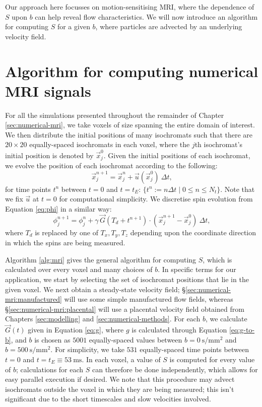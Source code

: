         Our approach here focusses on motion-sensitising MRI, where the dependence of $S$ upon $b$ can help reveal flow characteristics. We will now introduce an algorithm for computing $S$ for a given $b$, where particles are advected by an underlying velocity field.

    \section{Algorithm for computing numerical MRI signals} \label{sec:numerical-mri:algorithm}
        For all the simulations presented throughout the remainder of Chapter \ref{sec:numerical-mri}, we take voxels of size  spanning the entire domain of interest. We then distribute the initial positions of many isochromats such that there are $20 \times 20$ equally-spaced isochromats in each voxel, where the $j$th isochromat's initial position is denoted by $\vec{x}^0_j$. Given the initial positions of each isochromat, we evolve the position of each isochromat according to the following:
        \begin{equation}
            \vec{x}^{n+1}_j = \vec{x}^n_j + \vec{u}(\vec{x}^0_j) ~ \Delta t,
        \end{equation}
        for time points $t^n$ between $t=0$ and $t=t_E$: $\{ t^n := n \Delta t \mid 0 \leq n \leq N_t \}$. Note that we fix $\vec{u}$ at $t = 0$ for computational simplicity. We discretise spin evolution from Equation \eqref{eq:phi} in a similar way:
        \begin{equation}
            \phi^{n+1}_j = \phi^n_j + \gamma \, \vec{G}(T_d + t^{n+1}) \cdot (\vec{x}^{n+1}_j - \vec{x}^0_j) ~ \Delta t,
        \end{equation}
        where $T_d$ is replaced by one of $T_x, T_y, T_z$ depending upon the coordinate direction in which the spins are being measured.
        
        Algorithm \ref{alg:mri} gives the general algorithm for computing $S$, which is calculated over every voxel and many choices of $b$. In specific terms for our application, we start by selecting the set of isochromat positions that lie in the given voxel. We next obtain a steady-state velocity field; \S\ref{sec:numerical-mri:manufactured} will use some simple manufactured flow fields, whereas \S\ref{sec:numerical-mri:placental} will use a placental velocity field obtained from Chapters \ref{sec:modelling} and \ref{sec:numerical-methods}. For each $b$, we calculate $\vec{G}(t)$ given in Equation \eqref{eq:g}, where $g$ is calculated through Equation \eqref{eq:g-to-b}, and $b$ is chosen as $5001$ equally-spaced values between $b=\qty{0}{\second\per\milli\metre^2}$ and $b=\qty{500}{\second\per\milli\metre^2}$. For simplicity, we take $531$ equally-spaced time points between $t=0$ and $t = t_E \equiv \qty{53}{\milli\second}$. In each voxel, a value of $S$ is computed for every value of $b$; calculations for each $S$ can therefore be done independently, which allows for easy parallel execution if desired. We note that this procedure may advect isochromats outside the voxel in which they are being measured; this isn't significant due to the short timescales and slow velocities involved. 
        
